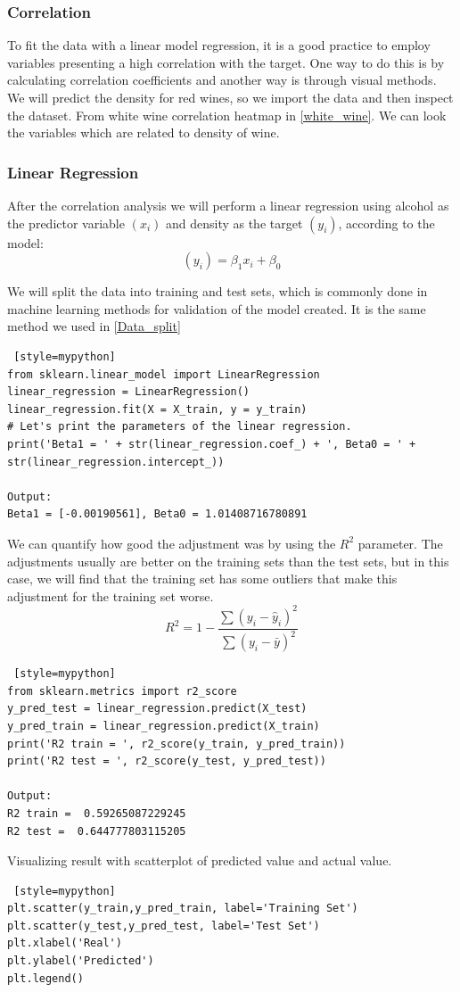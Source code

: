 \subsubsection{Correlation}
To fit the data with a linear model regression, it is a good practice to employ variables presenting a high correlation with the target. One way to do this is by calculating correlation coefficients and another way is through visual methods.
We will predict the density for red wines, so we import the data and then inspect the dataset.
From white wine correlation heatmap in \cref{white_wine}. We can look the variables which are related to density of wine.

\subsubsection{Linear Regression}
\label{linear_reg}
After the correlation analysis we will perform a linear regression using alcohol as the predictor variable $(x_i)$ and density as the target $(y_i)$, according to the model:
\[
(y_i)=\beta_1 x_i+\beta_0
\]

We will split the data into training and test sets, which is commonly done in machine learning methods for validation of the model created. It is the same method we used in \cref{Data_split}

\begin{lstlisting} [style=mypython]
from sklearn.linear_model import LinearRegression
linear_regression = LinearRegression()
linear_regression.fit(X = X_train, y = y_train)
# Let's print the parameters of the linear regression.
print('Beta1 = ' + str(linear_regression.coef_) + ', Beta0 = ' + str(linear_regression.intercept_))

Output:
Beta1 = [-0.00190561], Beta0 = 1.01408716780891
\end{lstlisting}


We can quantify how good the adjustment was by using the $R^2$ parameter. The adjustments usually are better on the training sets than the test sets, but in this case, we will find that the training set has some outliers that make this adjustment for the training set worse.
\[
R^2 = 1 - \frac{\sum (y_i - \hat{y}_i)^2}{\sum (y_i - \bar{y})^2}
\]


\begin{lstlisting} [style=mypython]
from sklearn.metrics import r2_score
y_pred_test = linear_regression.predict(X_test)
y_pred_train = linear_regression.predict(X_train)
print('R2 train = ', r2_score(y_train, y_pred_train))
print('R2 test = ', r2_score(y_test, y_pred_test))

Output:
R2 train =  0.59265087229245
R2 test =  0.644777803115205
\end{lstlisting}
Visualizing result with scatterplot of predicted value and actual value.
\begin{lstlisting} [style=mypython] 
plt.scatter(y_train,y_pred_train, label='Training Set')
plt.scatter(y_test,y_pred_test, label='Test Set')
plt.xlabel('Real')
plt.ylabel('Predicted')
plt.legend()
\end{lstlisting}

